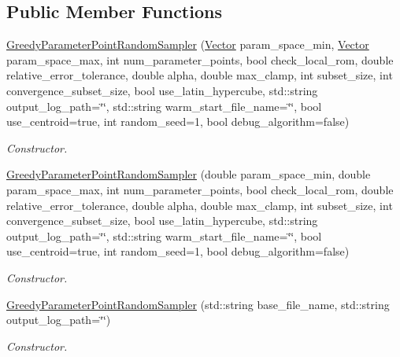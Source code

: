 \subsection*{Public Member Functions}
\begin{DoxyCompactItemize}
\item 
\hyperlink{class_c_a_r_o_m_1_1_greedy_parameter_point_random_sampler_acb9980dce191fe62d5de0f110ec3e816}{Greedy\-Parameter\-Point\-Random\-Sampler} (\hyperlink{class_c_a_r_o_m_1_1_vector}{Vector} param\-\_\-space\-\_\-min, \hyperlink{class_c_a_r_o_m_1_1_vector}{Vector} param\-\_\-space\-\_\-max, int num\-\_\-parameter\-\_\-points, bool check\-\_\-local\-\_\-rom, double relative\-\_\-error\-\_\-tolerance, double alpha, double max\-\_\-clamp, int subset\-\_\-size, int convergence\-\_\-subset\-\_\-size, bool use\-\_\-latin\-\_\-hypercube, std\-::string output\-\_\-log\-\_\-path=\char`\"{}\char`\"{}, std\-::string warm\-\_\-start\-\_\-file\-\_\-name=\char`\"{}\char`\"{}, bool use\-\_\-centroid=true, int random\-\_\-seed=1, bool debug\-\_\-algorithm=false)
\begin{DoxyCompactList}\small\item\em Constructor. \end{DoxyCompactList}\item 
\hyperlink{class_c_a_r_o_m_1_1_greedy_parameter_point_random_sampler_a661aa0a6169c1d97502048a440a4cd8a}{Greedy\-Parameter\-Point\-Random\-Sampler} (double param\-\_\-space\-\_\-min, double param\-\_\-space\-\_\-max, int num\-\_\-parameter\-\_\-points, bool check\-\_\-local\-\_\-rom, double relative\-\_\-error\-\_\-tolerance, double alpha, double max\-\_\-clamp, int subset\-\_\-size, int convergence\-\_\-subset\-\_\-size, bool use\-\_\-latin\-\_\-hypercube, std\-::string output\-\_\-log\-\_\-path=\char`\"{}\char`\"{}, std\-::string warm\-\_\-start\-\_\-file\-\_\-name=\char`\"{}\char`\"{}, bool use\-\_\-centroid=true, int random\-\_\-seed=1, bool debug\-\_\-algorithm=false)
\begin{DoxyCompactList}\small\item\em Constructor. \end{DoxyCompactList}\item 
\hyperlink{class_c_a_r_o_m_1_1_greedy_parameter_point_random_sampler_a27464bea40c1ca8b088aedcc3e06684f}{Greedy\-Parameter\-Point\-Random\-Sampler} (std\-::string base\-\_\-file\-\_\-name, std\-::string output\-\_\-log\-\_\-path=\char`\"{}\char`\"{})
\begin{DoxyCompactList}\small\item\em Constructor. \end{DoxyCompactList}\item 

\end{DoxyCompactItemize}
